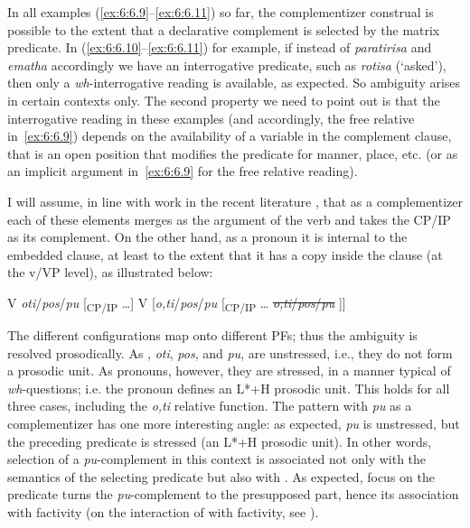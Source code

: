 \documentclass[output=paper]{langsci/langscibook}
\begin{document}
In all examples (\ref{ex:6:6.9}–\ref{ex:6:6.11}) so far, the complementizer construal is possible to the
extent that a declarative complement is selected by the matrix predicate. In
(\ref{ex:6:6.10}–\ref{ex:6:6.11}) for example, if instead of \emph{paratirisa} and \emph{ematha}
accordingly we have an interrogative predicate, such as \emph{rotisa}
(‘asked’), then only a \emph{wh}-interrogative reading is available, as expected. So
ambiguity arises in certain contexts only. The second property we need to point
out is that the interrogative reading in these examples (and accordingly, the
free relative in~\eqref{ex:6:6.9}) depends on the availability of a variable in the
complement clause, that is an open position that modifies the predicate for
manner, place, etc. (or as an implicit argument in~\eqref{ex:6:6.9} for the free relative
reading).

I will assume, in line with work in the recent literature
\parencite{ManSav2007,ManSav2011,Roussou2010,Franco2012}, that as a
complementizer each of these elements merges as the argument of the verb and
takes the CP/IP as its complement. On the other hand, as a pronoun it is
internal to the embedded clause, at least to the extent that it has a copy
inside the clause (at the v/VP level), as illustrated below:\largerpage

\ea\label{ex:6:6.12}
    \ea V \emph{oti}/\emph{pos}/\emph{pu} [\textsubscript{CP/}\textsubscript{IP} \dots{}]
    \ex V [\emph{o,ti}/\emph{pos}/\emph{pu} [\textsubscript{CP/}\textsubscript{IP} \dots{} \sout{\emph{o,ti}/\emph{pos}/\emph{pu}} ]]
	\z
\z

The different configurations map onto different \glspl{PF}; thus the ambiguity is
resolved prosodically. As , \emph{oti}, \emph{pos}, and
\emph{pu}, are unstressed, i.e., they do not form a prosodic unit. As pronouns,
however, they are stressed, in a manner typical of \emph{wh}-questions; i.e. the
pronoun defines an L*+H prosodic unit. This holds for all three cases,
including the \emph{o,ti} relative function. The pattern with \emph{pu} as a
complementizer has one more interesting angle: as expected, \emph{pu} is
unstressed, but the preceding predicate is stressed (an L*+H prosodic unit). In
other words, selection of a \emph{pu}{}-complement in this context is
associated not only with the semantics of the selecting predicate but also with
. As expected, focus on the predicate turns the \emph{pu}{}-complement to
the presupposed part, hence its association with factivity (on the interaction
of  with factivity, see \citealt{Kallulli2006}).
\end{document}
